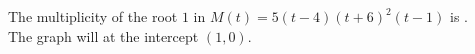 \documentclass{ximera}
\begin{document}
\begin{exercise}
\begin{question}
\end{question}








\begin{question}


The multiplicity of the root $1$ in $M(t) = 5(t - 4) (t + 6)^2 (t - 1)$ is . \\



The graph will  at the intercept $(1, 0)$.



\end{question}








\end{exercise}
\end{document}
